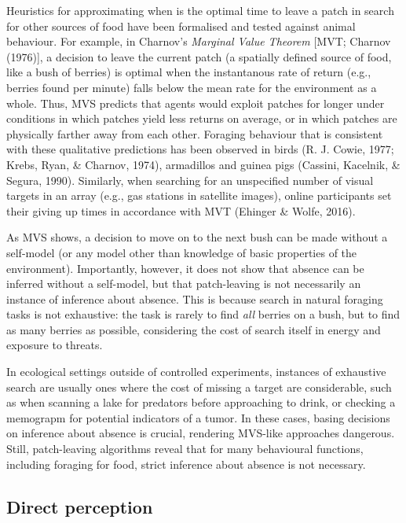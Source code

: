 \documentclass[12pt,twoside]{reedthesis}
\begin{document}
Heuristics for approximating when is the optimal time to leave a patch in search for other sources of food have been formalised and tested against animal behaviour. For example, in Charnov's \emph{Marginal Value Theorem} {[}MVT; Charnov (1976){]}, a decision to leave the current patch (a spatially defined source of food, like a bush of berries) is optimal when the instantanous rate of return (e.g., berries found per minute) falls below the mean rate for the environment as a whole. Thus, MVS predicts that agents would exploit patches for longer under conditions in which patches yield less returns on average, or in which patches are physically farther away from each other. Foraging behaviour that is consistent with these qualitative predictions has been observed in birds (R. J. Cowie, 1977; Krebs, Ryan, \& Charnov, 1974), armadillos and guinea pigs (Cassini, Kacelnik, \& Segura, 1990). Similarly, when searching for an unspecified number of visual targets in an array (e.g., gas stations in satellite images), online participants set their giving up times in accordance with MVT (Ehinger \& Wolfe, 2016).

As MVS shows, a decision to move on to the next bush can be made without a self-model (or any model other than knowledge of basic properties of the environment). Importantly, however, it does not show that absence can be inferred without a self-model, but that patch-leaving is not necessarily an instance of inference about absence. This is because search in natural foraging tasks is not exhaustive: the task is rarely to find \emph{all} berries on a bush, but to find as many berries as possible, considering the cost of search itself in energy and exposure to threats.

In ecological settings outside of controlled experiments, instances of exhaustive search are usually ones where the cost of missing a target are considerable, such as when scanning a lake for predators before approaching to drink, or checking a memograpm for potential indicators of a tumor. In these cases, basing decisions on inference about absence is crucial, rendering MVS-like approaches dangerous. Still, patch-leaving algorithms reveal that for many behavioural functions, including foraging for food, strict inference about absence is not necessary.

\hypertarget{absenceperception}{%
\subsection*{Direct perception}\label{absenceperception}}
\end{document}

